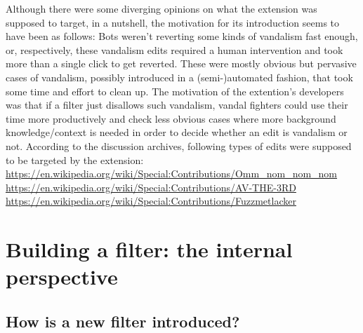 Although there were some diverging opinions on what the extension was supposed to target, in a nutshell, the motivation for its introduction seems to have been as follows:
Bots weren't reverting some kinds of vandalism fast enough, or, respectively, these vandalism edits required a human intervention and took more than a single click to get reverted.
These were mostly obvious but pervasive cases of vandalism, possibly introduced in a (semi-)automated fashion, that took some time and effort to clean up.
The motivation of the extention's developers was that if a filter just disallows such vandalism, vandal fighters could use their time more productively and check less obvious cases where more background knowledge/context is needed in order to decide whether an edit is vandalism or not.
According to the discussion archives, following types of edits were supposed to be targeted by the extension:\\
\url{https://en.wikipedia.org/wiki/Special:Contributions/Omm_nom_nom_nom}\\
\url{https://en.wikipedia.org/wiki/Special:Contributions/AV-THE-3RD}\\
\url{https://en.wikipedia.org/wiki/Special:Contributions/Fuzzmetlacker}\\



\section{Building a filter: the internal perspective}
\subsection{How is a new filter introduced?}


